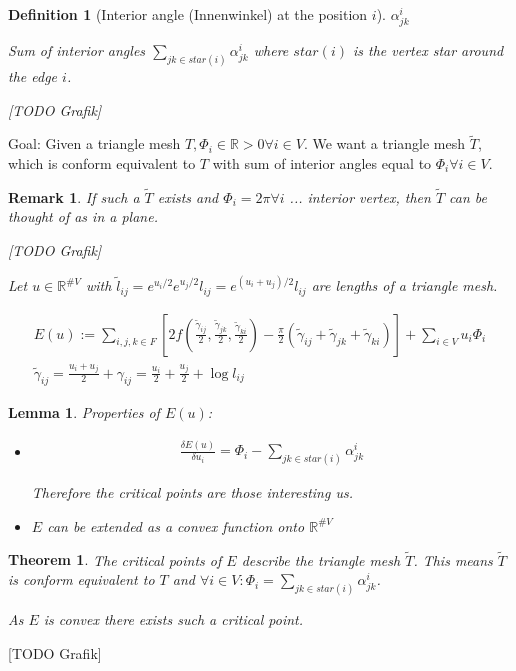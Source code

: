 \documentclass[]{article}
\newtheorem{lemma}{Lemma}
\newtheorem{theorem}{Theorem}
\newtheorem{definition}{Definition}
\newtheorem{remark}{Remark}
\begin{document}
\begin{definition}[Interior angle (Innenwinkel) at the position $i$]
	
	$\alpha_{jk}^i$
	
	Sum of interior angles $\sum_{jk \in star(i)}\alpha_{jk}^i$ where $star(i)$ is the vertex star around the edge $i$.
	
	[TODO Grafik]
	
\end{definition}

Goal: Given a triangle mesh $T, \Phi_i \in \mathbb{R}{>0} \forall i \in V$. We want a triangle mesh $\tilde{T}$, which is conform equivalent to $T$ with sum of interior angles equal to $\Phi_i \forall i \in V$.

\begin{remark}
	If such a $\tilde{T}$ exists and $\Phi_i = 2\pi \forall i$ ... interior vertex, then $\tilde{T}$ can be thought of as in a plane.
	
	[TODO Grafik]
	
	Let $u \in \mathbb{R}^{\# V}$ with $\tilde{l}_{ij} = e^{u_i/2} e^{u_j/2} l_{ij} = e^{(u_i+u_j)/2} l_{ij}$ are lengths of a triangle mesh.
	
	\begin{align*}
		E(u) := \sum_{i,j,k \in F} \left[2 f\left( \frac{\tilde{\gamma}_{ij}}{2}, \frac{\tilde{\gamma}_{jk}}{2}, \frac{\tilde{\gamma}_{ki}}{2} \right) - \frac{\pi}{2} (\tilde{\gamma}_{ij} + \tilde{\gamma}_{jk} + \tilde{\gamma}_{ki}) \right] + \sum_{i\in V} u_i \Phi_i\\
		\tilde{\gamma}_{ij} = \frac{u_i + u_j}{2} + \gamma_{ij} = \frac{u_i}{2} + \frac{u_j}{2} + \log l_{ij}
	\end{align*}
\end{remark}

\begin{lemma}
	Properties of $E(u)$:
	\begin{itemize}
		\item
		\begin{align*}
			\frac{\delta E(u)}{\delta u_i} = \Phi_i - \sum_{jk \in star(i)} \alpha_{jk}^i
		\end{align*}
		
		Therefore the critical points are those interesting us.
		\item  $E$ can be extended as a convex function onto $\mathbb{R}^{\# V}$
	\end{itemize}
\end{lemma}

\begin{theorem}
	The critical points of $E$ describe the triangle mesh $\tilde{T}$. This means $\tilde{T}$ is conform equivalent to $T$ and $\forall i \in V: \Phi_i = \sum_{jk \in star(i)} \alpha_{jk}^i$.
	
	As $E$ is convex there exists such a critical point.
\end{theorem}

[TODO Grafik]
\end{document}
